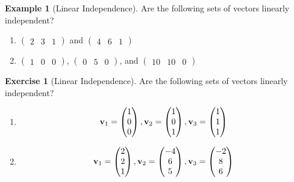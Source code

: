 \documentclass[
]{book}
\providecommand{\tightlist}{%
  \setlength{\itemsep}{0pt}\setlength{\parskip}{0pt}}
\theoremstyle{definition}
\theoremstyle{definition}
\newtheorem{example}{Example}[chapter]
\theoremstyle{definition}
\newtheorem{exercise}{Exercise}[chapter]
\theoremstyle{remark}
\begin{document}
\begin{example}[Linear Independence]
\protect\hypertarget{exm:linearindep}{}{\label{exm:linearindep} {} }
Are the following sets of vectors linearly independent?

\begin{enumerate}
\def\labelenumi{\arabic{enumi}.}
\tightlist
\item
  \(\begin{pmatrix}2 & 3 & 1 \end{pmatrix}\) and \(\begin{pmatrix}4 & 6 & 1 \end{pmatrix}\)
\item
  \(\begin{pmatrix}1 & 0 & 0 \end{pmatrix}\), \(\begin{pmatrix}0 & 5 & 0 \end{pmatrix}\), and \(\begin{pmatrix}10 & 10 & 0 \end{pmatrix}\)
\end{enumerate}
\end{example}

\begin{exercise}[Linear Independence]
\protect\hypertarget{exr:linearindep1}{}{\label{exr:linearindep1} {} }
Are the following sets of vectors linearly independent?

\begin{enumerate}
\def\labelenumi{\arabic{enumi}.}
\item
  \[{\bf v}_1 = \begin{pmatrix} 1 \\ 0 \\ 0 \end{pmatrix} , {\bf v}_2 = \begin{pmatrix} 1 \\ 0 \\ 1 \end{pmatrix} , {\bf v}_3 = \begin{pmatrix} 1 \\ 1 \\ 1 \end{pmatrix} \]
\item
  \[{\bf v}_1 = \begin{pmatrix} 2 \\ 2 \\ 1 \end{pmatrix} , {\bf v}_2 = \begin{pmatrix} -4 \\ 6 \\ 5 \end{pmatrix} , {\bf v}_3 = \begin{pmatrix} -2 \\ 8 \\ 6 \end{pmatrix} \]
\end{enumerate}
\end{exercise}
\end{document}
